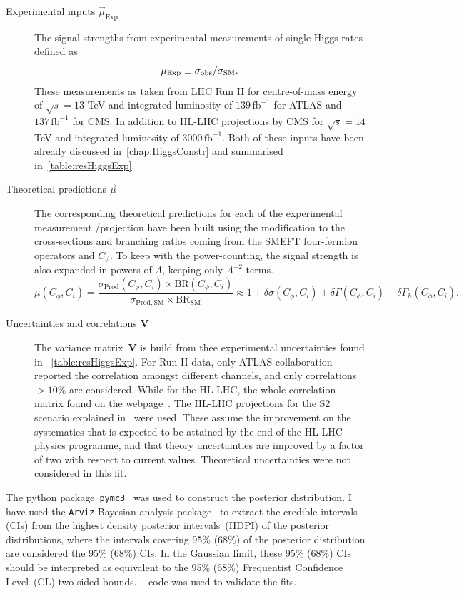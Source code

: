 \begin{description}
	\item[Experimental inputs $\vec{\mu}_{\mathrm{Exp}}$ ] The signal strengths from experimental measurements of single Higgs rates defined as
	\begin{equation}
		\mu_{\mathrm{Exp}}\equiv \sigma_{\mathrm{obs}}/\sigma_{\mathrm{SM}}.
	\end{equation}
These measurements as taken from LHC Run II for centre-of-mass energy of $\sqrt{s} = 13$ TeV and  integrated luminosity of $ 139\, \mathrm{fb}^{-1}$ for ATLAS and  $ 137\,\mathrm{fb}^{-1}$ for CMS. In addition to HL-LHC projections by CMS for $\sqrt{s} = 14$ TeV and  integrated luminosity of $ 3000\, \mathrm{fb}^{-1}$. Both of these inputs have been already discussed in~\autoref{chap:HiggsConstr} and summarised in~\autoref{table:resHiggsExp}.
\item [Theoretical predictions $\vec{\mu}$ ]  The corresponding theoretical predictions for each of the experimental measurement /projection have been built using the modification to the cross-sections and branching ratios coming from the SMEFT four-fermion operators and $C_\phi$. To keep with the power-counting, the signal strength is also expanded in powers of $\Lambda$, keeping only $ \Lambda^{-2}$ terms. 
\begin{equation}
	\mu(C_\phi,C_i)=\frac{\sigma_\mathrm{ Prod}(C_\phi,C_i) \times \mathrm{ BR}(C_\phi,C_i)}{\sigma_\mathrm{ Prod, SM}\times \mathrm{BR}_\mathrm{ SM}} \approx 1+\delta \sigma(C_\phi,C_i)+\delta\Gamma(C_\phi,C_i)-\delta \Gamma_h(C_\phi,C_i).
	\label{linear-mu}
\end{equation}
\item [Uncertainties and correlations $\mathbf{V}$ ]  The variance matrix~$\mathbf{V}$ is build from thee experimental uncertainties found in ~\autoref{table:resHiggsExp}. For Run-II data, only ATLAS collaboration reported the correlation amongst different channels, and only correlations $> 10\%$ are considered. While for the HL-LHC, the whole correlation matrix found on the webpage~\cite{twiki}.  The HL-LHC projections for the S2 scenario explained in~\cite{Cepeda:2019klc} were used. These assume the improvement on the systematics that is expected to be attained by the end of the HL-LHC physics programme, and that theory uncertainties are improved by a factor of two with respect to current values. Theoretical uncertainties were not considered in this fit.
\end{description}
The python package~\texttt{pymc3}~\cite{Salvatier2016} was used to construct the posterior distribution. I have used the \texttt{Arviz} Bayesian analysis package~\cite{arviz_2019} to extract the credible intervals (CIs) from the highest density posterior intervals~(HDPI) of the posterior distributions, where the intervals covering 95\% (68\%) of the posterior distribution are considered the 95\% (68\%) CIs. In the Gaussian limit, these  95\% (68\%) CIs should be interpreted as equivalent to the 95\%  (68\%) Frequentist  Confidence Level~(CL) two-sided bounds. \HEPfit~\cite{deBlas:2019okz} code was used to validate the fits.
